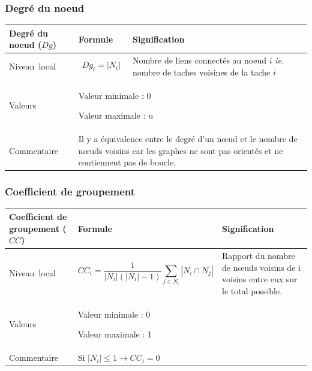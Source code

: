 \documentclass{article}
\begin{document}
\subsubsection{Degré du noeud}
\label{metric_Dg}
\begin{table}[H]
\raggedright
\begin{tabular}{|m{3.24cm}|m{4.4810004cm}m{7.924cm}|}

\hline
Degré du noeud ($Dg$) &
\multicolumn{1}{m{4.4810004cm}|}{Formule} &
Signification\\\hline
Niveau~local 

 &
\multicolumn{1}{m{4.4810004cm}|}{\begin{equation*}
{\mathit{Dg}}_{i}=\left|{N}_{i}\right|
\end{equation*}
} & 
Nombre de liens connectés au noeud $i$ \textit{ie.} nombre de taches voisines de la tache $i$\\\hline
Valeurs &
\multicolumn{2}{m{12.6050005cm}|}{Valeur minimale : 0

Valeur maximale :  $n$

}\\\hline
Commentaire &
\multicolumn{2}{m{12.6050005cm}|}{Il y a équivalence entre le degré d’un nœud et le nombre de nœuds voisins car les graphes ne sont pas orientés et ne contiennent pas de boucle.

}\\\hline
\end{tabular}
\end{table}


\subsubsection{Coefficient de groupement}
\label{metric_CC}
\begin{table}[H]
\raggedright
\begin{tabular}{|m{3.24cm}|m{5.303cm}m{7.103cm}|}

\hline
Coefficient de groupement ($CC$) &
\multicolumn{1}{m{5.303cm}|}{Formule} &
Signification\\\hline
Niveau~local 

 &
\multicolumn{1}{m{5.303cm}|}{\begin{equation*}
{\mathit{CC}}_{i}=\frac{1}{\left|{N}_{i}\right|\left(\left|{N}_{i}\right|-1\right)}\sum _{j{\in}{N}_{i}}{\left|{N}_{i}{\cap}{N}_{j}\right|}
\end{equation*}
} &
Rapport du nombre de nœuds voisins de i voisins entre eux sur le total possible.\\\hline
Valeurs &
\multicolumn{2}{m{12.606cm}|}{Valeur minimale : 0

Valeur maximale : 1}\\\hline
Commentaire &
\multicolumn{2}{m{12.606cm}|}{Si  $\left|{N}_{i}\right|{\leq}1\rightarrow {\mathit{CC}}_{i}=0$ }\\\hline
\end{tabular}
\end{table}
\end{document}
